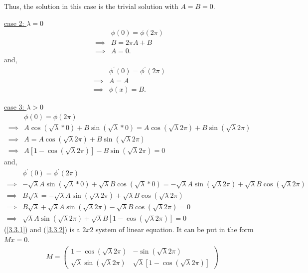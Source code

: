\documentclass{article}
\begin{document}
\noindent
Thus, the solution in this case is the trivial solution with $A=B=0$.
\newline

\underline{case 2: $\lambda = 0$}
\begin{align*}
  &\phi(0) = \phi(2\pi) \\
  \implies& B = 2\pi A + B \\
  \implies& A = 0.
\end{align*}
and,
\begin{align*}
  &\phi^{\prime}(0) = \phi^{\prime}(2\pi) \\
  \implies& A = A \\
  \implies& \phi(x) = B.
\end{align*}

\underline{case 3: $\lambda > 0$}
\begin{align}
  &\phi(0) = \phi(2\pi) \nonumber \\
  \implies& A \cos(\sqrt{\lambda} * 0) + 
  B \sin(\sqrt{\lambda} * 0)
  = A \cos(\sqrt{\lambda} 2\pi) + 
  B \sin(\sqrt{\lambda} 2\pi) \nonumber \\
  \implies& A
  = A \cos(\sqrt{\lambda} 2\pi) + 
  B \sin(\sqrt{\lambda} 2\pi) \nonumber \\
  \implies& A [1 - \cos(\sqrt{\lambda} 2\pi)]
  - 
  B \sin(\sqrt{\lambda} 2\pi) = 0 \label{3.3.1}
\end{align}
and,
\begin{align}
  &\phi^{\prime}(0) = \phi^{\prime}(2\pi) \nonumber \\
  \implies& -\sqrt{\lambda} A \sin(\sqrt{\lambda} * 0) + 
  \sqrt{\lambda} B\cos(\sqrt{\lambda}  * 0)
  =
  -\sqrt{\lambda} A \sin(\sqrt{\lambda} 2\pi) + 
  \sqrt{\lambda} B\cos(\sqrt{\lambda} 2\pi) \nonumber \\
  \implies& B\sqrt{\lambda}
  =
  -\sqrt{\lambda} A \sin(\sqrt{\lambda} 2\pi) + 
  \sqrt{\lambda} B\cos(\sqrt{\lambda} 2\pi) \nonumber \\
  \implies& B\sqrt{\lambda}
  +
  \sqrt{\lambda} A \sin(\sqrt{\lambda} 2\pi) 
  - 
  \sqrt{\lambda} B\cos(\sqrt{\lambda} 2\pi) 
  = 0 \nonumber \\
  \implies& \sqrt{\lambda} A \sin(\sqrt{\lambda} 2\pi) 
  +\sqrt{\lambda} B [1 - \cos(\sqrt{\lambda} 2\pi)] = 0 \label{3.3.2}
\end{align}
(\ref{3.3.1}) and (\ref{3.3.2}) is a $2x2$ system of linear equation. It can be put in the form $Mx = 0$.
\begin{align*}
  &M = \begin{pmatrix}
    1 - \cos(\sqrt{\lambda} 2\pi) & 
    -\sin(\sqrt{\lambda} 2\pi) \\ 
    \sqrt{\lambda} \sin(\sqrt{\lambda} 2\pi) & 
    \sqrt{\lambda} [1 - \cos(\sqrt{\lambda} 2\pi)]
  \end{pmatrix} \\
\end{align*}
\end{document}
